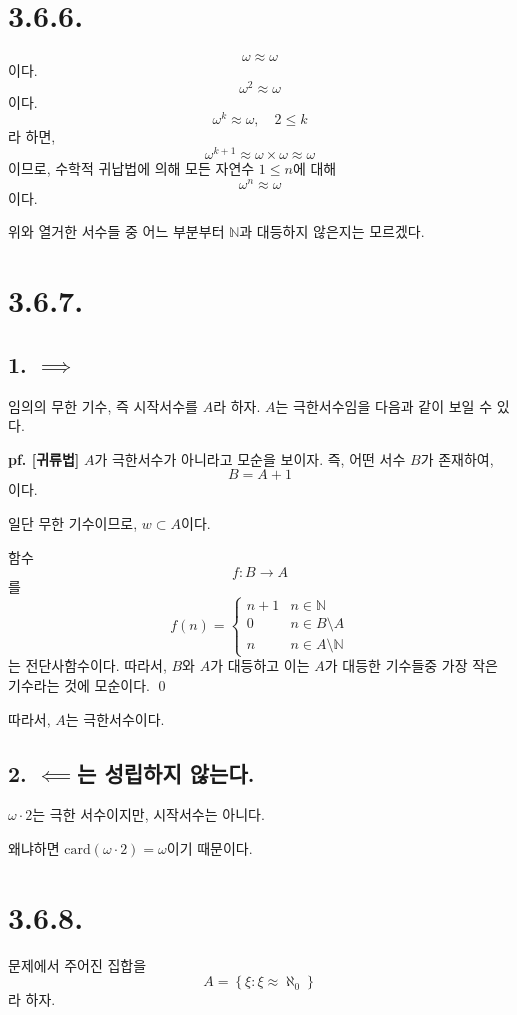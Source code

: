 \documentclass{article}
\begin{document}
\section{3.6.6.}
$$\omega \approx \omega$$이다.
$$\omega^2 \approx \omega$$이다.
$$\omega^k \approx \omega, \quad 2 \le k$$라 하면,
$$\omega^{k+1} \approx \omega \times \omega \approx \omega$$이므로,
수학적 귀납법에 의해 모든 자연수 $1 \le n$에 대해
$$\omega^n \approx \omega$$이다.

위와 열거한 서수들 중 어느 부분부터 $\mathbb{N}$과 대등하지 않은지는 모르겠다.

\section{3.6.7.}
\subsection{1. $\implies$}
임의의 무한 기수, 즉 시작서수를 $A$라 하자. $A$는 극한서수임을 다음과 같이 보일 수 있다.

\textbf{pf. [귀류법]} $A$가 극한서수가 아니라고 모순을 보이자. 즉, 어떤 서수 $B$가 존재하여, $$B = A + 1$$이다.

일단 무한 기수이므로, $w \subset A$이다.

함수
$$f : B \rightarrow A$$를
$$
f(n) = 
\left\{
\begin{matrix}
n+1 & n \in \mathbb{N}
\\ 0 & n \in B \setminus A
\\ n & n \in A \setminus \mathbb{N}
\end{matrix}
\right.
$$ 는 전단사함수이다. 따라서, $B$와 $A$가 대등하고 이는 
$A$가 대등한 기수들중 가장 작은 기수라는 것에 모순이다. \qed

따라서, $A$는 극한서수이다.

\subsection{2. $\impliedby$는 성립하지 않는다.}
$\omega \cdot 2$는 극한 서수이지만, 시작서수는 아니다.

왜냐하면 $\text{card} (\omega \cdot 2) = \omega$이기 때문이다. 

\section{3.6.8.}
문제에서 주어진 집합을
$$A = \left\{ \xi : \xi \approx \aleph_0 \right\}$$
라 하자.
\end{document}
